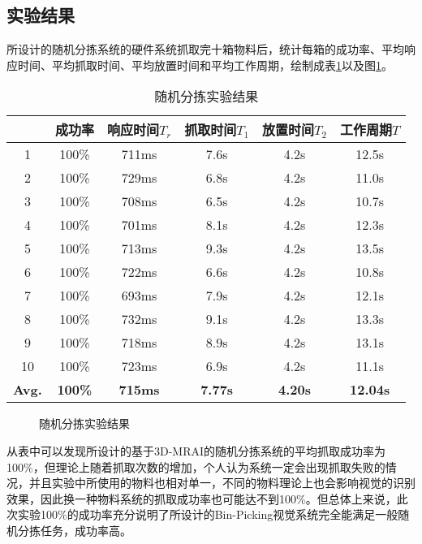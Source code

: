 \subsection{实验结果}
所设计的随机分拣系统的硬件系统抓取完十箱物料后，统计每箱的成功率、平均响应时间、平均抓取时间、平均放置时间和平均工作周期，绘制成表\ref{tab:app_res}以及图\ref{fig:app_res}。
\begin{table}[ht]
  \centering
  \begin{tabular}{cccccc}
    \toprule
    &成功率&响应时间$T_r$&抓取时间$T_1$&放置时间$T_2$&工作周期$T$ \\
    \midrule
    1&100\%&711ms&7.6s&4.2s&12.5s \\
    2&100\%&729ms&6.8s&4.2s&11.0s \\
    3&100\%&708ms&6.5s&4.2s&10.7s \\
    4&100\%&701ms&8.1s&4.2s&12.3s \\
    5&100\%&713ms&9.3s&4.2s&13.5s \\
    6&100\%&722ms&6.6s&4.2s&10.8s \\
    7&100\%&693ms&7.9s&4.2s&12.1s \\
    8&100\%&732ms&9.1s&4.2s&13.3s \\
    9&100\%&718ms&8.9s&4.2s&13.1s \\
    10&100\%&723ms&6.9s&4.2s&11.1s \\
    \bf{Avg.}&\bf{100\%}&\bf{715ms}&\bf{7.77s}&\bf{4.20s}&\bf{12.04s} \\
    \bottomrule
  \end{tabular}
  \caption{随机分拣实验结果}
  \label{tab:app_res}
\end{table}
\begin{figure}[ht]
  \centering
  \hskip0.5cm
  \vfill
  \hskip0.5cm
  \vfill
  \caption{随机分拣实验结果}
  \label{fig:app_res}
\end{figure}
从表中可以发现所设计的基于3D-MRAI的随机分拣系统的平均抓取成功率为100\%，但理论上随着抓取次数的增加，个人认为系统一定会出现抓取失败的情况，并且实验中所使用的物料也相对单一，不同的物料理论上也会影响视觉的识别效果，因此换一种物料系统的抓取成功率也可能达不到100\%。但总体上来说，此次实验100\%的成功率充分说明了所设计的Bin-Picking视觉系统完全能满足一般随机分拣任务，成功率高。

